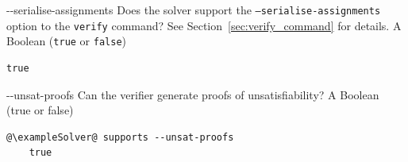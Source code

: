 \clOutputOption
{-{}-serialise-assignments}
{Does the solver support the \texttt{--serialise-assignments} option to the \texttt{verify} command? See Section~\ref{sec:verify_command} for details.}
{A Boolean (\texttt{true} or \texttt{false})}
\begin{lstlisting}[style=bash]
%*\exampleSolver* supports --serialise-assignments
true
\end{lstlisting}

\clOutputOption
{-{}-unsat-proofs}
{Can the verifier generate proofs of unsatisfiability?} 
{A Boolean (true or false)}
{}
\begin{lstlisting}[style=bash,escapechar=@]
	@\exampleSolver@ supports --unsat-proofs
	true
\end{lstlisting}